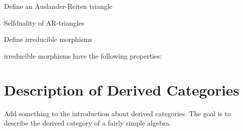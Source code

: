 
    \begin{definition}
        Define an Auslander-Reiten triangle
    \end{definition}

    \begin{prop}
        Selfduality of AR-triangles
    \end{prop}

    \begin{definition}
        Define irreducible morphisms
    \end{definition}

    \begin{prop}
        irreducible morphisms have the following properties:
    \end{prop}
    
\section{Description of Derived Categories}

    Add something to the introduction about derived categories. The goal is to describe the derived category of a fairly simple algebra.

\clearpage

% 
% 

\clearpage
